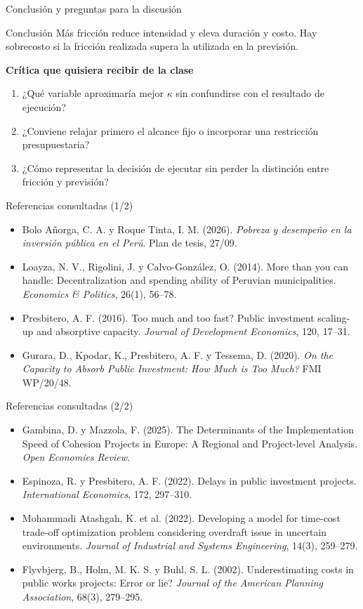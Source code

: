 \documentclass[aspectratio=169,11pt]{beamer}
\begin{document}
\begin{frame}{Conclusión y preguntas para la discusión}
\begin{block}{Conclusión}
Más fricción reduce intensidad y eleva duración y costo. Hay sobrecosto si la fricción realizada supera la utilizada en la previsión.
\end{block}
\textbf{Crítica que quisiera recibir de la clase}
\begin{enumerate}\setlength{\itemsep}{.5em}
\item ¿Qué variable aproximaría mejor $\kappa$ sin confundirse con el resultado de ejecución?
\item ¿Conviene relajar primero el alcance fijo o incorporar una restricción presupuestaria?
\item ¿Cómo representar la decisión de ejecutar sin perder la distinción entre fricción y previsión?
\end{enumerate}
\end{frame}

\begin{frame}{Referencias consultadas (1/2)}
\small
\begin{itemize}\setlength{\itemsep}{.55em}
\item Bolo Añorga, C. A. y Roque Tinta, I. M. (2026). \emph{Pobreza y desempeño en la inversión pública en el Perú}. Plan de tesis, 27/09.
\item Loayza, N. V., Rigolini, J. y Calvo-González, O. (2014). More than you can handle: Decentralization and spending ability of Peruvian municipalities. \emph{Economics \& Politics}, 26(1), 56--78.
\item Presbitero, A. F. (2016). Too much and too fast? Public investment scaling-up and absorptive capacity. \emph{Journal of Development Economics}, 120, 17--31.
\item Gurara, D., Kpodar, K., Presbitero, A. F. y Tessema, D. (2020). \emph{On the Capacity to Absorb Public Investment: How Much is Too Much?} FMI WP/20/48.
\end{itemize}
\end{frame}

\begin{frame}{Referencias consultadas (2/2)}
\small
\begin{itemize}\setlength{\itemsep}{.45em}
\item Gambina, D. y Mazzola, F. (2025). The Determinants of the Implementation Speed of Cohesion Projects in Europe: A Regional and Project-level Analysis. \emph{Open Economies Review}.
\item Espinoza, R. y Presbitero, A. F. (2022). Delays in public investment projects. \emph{International Economics}, 172, 297--310.
\item Mohammadi Atashgah, K. et al. (2022). Developing a model for time-cost trade-off optimization problem considering overdraft issue in uncertain environments. \emph{Journal of Industrial and Systems Engineering}, 14(3), 259--279.
\item Flyvbjerg, B., Holm, M. K. S. y Buhl, S. L. (2002). Underestimating costs in public works projects: Error or lie? \emph{Journal of the American Planning Association}, 68(3), 279--295.
\end{itemize}
\end{frame}
\end{document}
